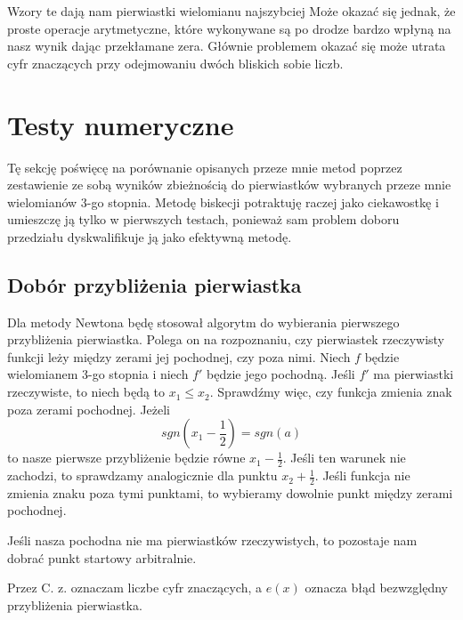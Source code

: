 \documentclass[a4paper]{article}
\begin{document}
    Wzory te dają nam pierwiastki wielomianu najszybciej Może okazać się jednak, że proste operacje arytmetyczne,
    które wykonywane są po drodze bardzo wpłyną na nasz wynik dając przekłamane zera. Głównie problemem okazać się 
    może utrata cyfr znaczących przy odejmowaniu dwóch bliskich sobie liczb.

\newpage
\section{Testy numeryczne}
    Tę sekcję poświęcę na porównanie opisanych przeze mnie metod poprzez zestawienie ze sobą wyników zbieżnością
    do pierwiastków wybranych przeze mnie wielomianów 3-go stopnia. Metodę biskecji potraktuję raczej jako ciekawostkę
    i umieszczę ją tylko w pierwszych testach, ponieważ sam problem doboru przedziału dyskwalifikuje ją jako 
    efektywną metodę.

    \vspace{5mm}

    \subsection{Dobór przybliżenia pierwiastka}
    Dla metody Newtona będę stosował algorytm do wybierania pierwszego przybliżenia pierwiastka. Polega 
    on na rozpoznaniu, czy pierwiastek rzeczywisty funkcji leży między zerami jej pochodnej, czy poza nimi. Niech
    $f$ będzie wielomianem 3-go stopnia i niech $f'$ będzie jego pochodną. Jeśli $f'$ ma pierwiastki rzeczywiste,
    to niech będą to $x_1 \leq x_2$. Sprawdźmy więc, czy funkcja zmienia znak poza zerami pochodnej. Jeżeli
    \[
        sgn(x_1 - \frac{1}{2}) = sgn(a)  
    \]
    to nasze pierwsze przybliżenie będzie równe $x_1 - \frac{1}{2}$. Jeśli ten warunek nie zachodzi, to 
    sprawdzamy analogicznie dla punktu $x_2 + \frac{1}{2}$. Jeśli funkcja nie zmienia znaku poza tymi punktami, 
    to wybieramy dowolnie punkt między zerami pochodnej.

    Jeśli nasza pochodna nie ma pierwiastków rzeczywistych, to pozostaje nam dobrać punkt startowy arbitralnie.

    \vspace{5mm}
        
    Przez C. z. oznaczam liczbe cyfr znaczących, a $e(x)$ oznacza błąd bezwzględny przybliżenia pierwiastka.

\newpage
\end{document}

